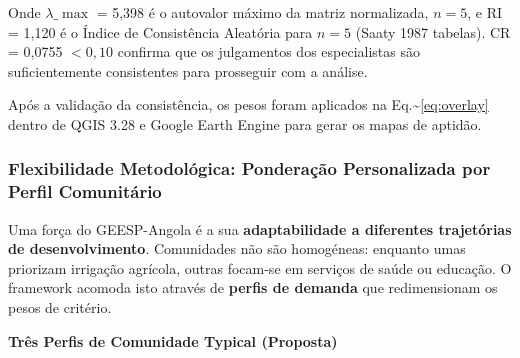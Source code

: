 \documentclass[12pt, a4paper]{article}
\begin{document}
Onde $\lambda\_{\max}$ = 5,398 é o autovalor máximo da matriz normalizada, $n = 5$, e RI = 1,120 é o Índice de Consistência Aleatória para $n=5$ (Saaty 1987 tabelas). CR = 0,0755 $< 0,10$ confirma que os julgamentos dos especialistas são suficientemente consistentes para prosseguir com a análise.

Após a validação da consistência, os pesos foram aplicados na Eq.\textasciitilde{}\ref{eq:overlay} dentro de QGIS 3.28 e Google Earth Engine para gerar os mapas de aptidão.

\subsubsection{Flexibilidade Metodológica: Ponderação Personalizada por Perfil Comunitário}

Uma força do GEESP-Angola é a sua \textbf{adaptabilidade a diferentes trajetórias de 
desenvolvimento}. Comunidades não são homogéneas: enquanto umas priorizam irrigação 
agrícola, outras focam-se em serviços de saúde ou educação. O framework acomoda 
isto através de \textbf{perfis de demanda} que redimensionam os pesos de critério.

\textbf{Três Perfis de Comunidade Typical (Proposta)}

\begin{table}[H]
\centering
\caption{Pesos de Critério por Perfil de Comunidade}
\label{Tab:1}
\footnotesize
{}
\end{table}
\end{document}
